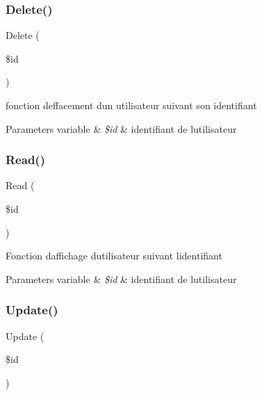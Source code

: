 \subsubsection{\texorpdfstring{Delete()}{Delete()}}
{\footnotesize\ttfamily Delete (\begin{DoxyParamCaption}\item[{}]{\$id }\end{DoxyParamCaption})}

fonction d\textquotesingle{}effacement d\textquotesingle{}un utilisateur suivant son identifiant 
\begin{DoxyParams}[1]{Parameters}
variable & {\em \$id} & identifiant de l\textquotesingle{}utilisateur \\
\hline
\end{DoxyParams}
\mbox{\label{class_src_1_1_managers_1_1user_manager_ad2bbc9b3130abdfe3a9fc9e9fe36716f}} 
\subsubsection{\texorpdfstring{Read()}{Read()}}
{\footnotesize\ttfamily Read (\begin{DoxyParamCaption}\item[{}]{\$id }\end{DoxyParamCaption})}

Fonction d\textquotesingle{}affichage d\textquotesingle{}utilisateur suivant l\textquotesingle{}identifiant 
\begin{DoxyParams}[1]{Parameters}
variable & {\em \$id} & identifiant de l\textquotesingle{}utilisateur \\
\hline
\end{DoxyParams}
\mbox{\label{class_src_1_1_managers_1_1user_manager_a82232b33fbfacdbdb8a8f49acaecf564}} 
\subsubsection{\texorpdfstring{Update()}{Update()}}
{\footnotesize\ttfamily Update (\begin{DoxyParamCaption}\item[{}]{\$id }\end{DoxyParamCaption})}

